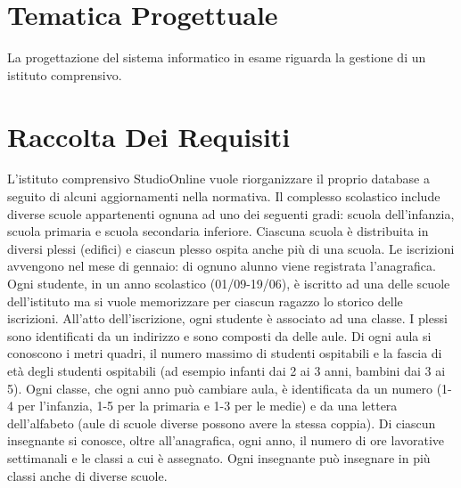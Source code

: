 \documentclass{article}
\begin{document}
\section{Tematica Progettuale}
La progettazione del sistema informatico in esame riguarda la gestione di un istituto comprensivo.

\section{Raccolta Dei Requisiti}
L’istituto comprensivo StudioOnline vuole riorganizzare il proprio database a seguito di alcuni aggiornamenti nella normativa. Il complesso scolastico include diverse scuole appartenenti ognuna ad uno dei seguenti gradi: scuola dell’infanzia, scuola primaria e scuola secondaria inferiore. Ciascuna scuola è distribuita in diversi plessi (edifici) e ciascun plesso ospita anche più di una scuola. Le iscrizioni avvengono nel mese di gennaio: di ognuno alunno viene registrata l’anagrafica. Ogni studente, in un anno scolastico (01/09-19/06), è iscritto ad una delle scuole dell’istituto ma si vuole memorizzare per ciascun ragazzo lo storico delle iscrizioni. All’atto dell’iscrizione, ogni studente è associato ad una classe. I plessi sono identificati da un indirizzo e sono composti da delle aule. Di ogni aula si conoscono i metri quadri, il numero massimo di studenti ospitabili e la fascia di età degli studenti ospitabili (ad esempio infanti dai 2 ai 3 anni, bambini dai 3 ai 5). Ogni classe, che ogni anno può cambiare aula, è identificata da un numero (1-4 per l’infanzia, 1-5 per la primaria e 1-3 per le medie) e da una lettera dell’alfabeto (aule di scuole diverse possono avere la stessa coppia). Di ciascun insegnante si conosce, oltre all’anagrafica, ogni anno, il numero di ore lavorative settimanali e le classi a cui è assegnato. Ogni insegnante può insegnare in più classi anche di diverse scuole.
\end{document}
